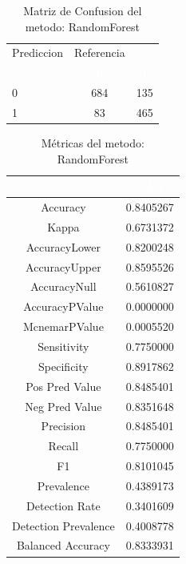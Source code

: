 \documentclass[]{article}
\begin{document}
\begin{table}[!h]

\caption{\label{tab:MatrizConf_RandomForest}Matriz de Confusion del metodo: RandomForest }
\centering
\begin{tabular}[t]{lcc}
\toprule
\multicolumn{1}{c}{Prediccion} & \multicolumn{1}{c}{Referencia} & \multicolumn{1}{c}{ } \\
\cmidrule(l{3pt}r{3pt}){1-1} \cmidrule(l{3pt}r{3pt}){2-2}
\rowcolor{black}  \multicolumn{1}{c}{\textcolor{white}{\textbf{ }}} & \multicolumn{1}{c}{\textcolor{white}{\textbf{0}}} & \multicolumn{1}{c}{\textcolor{white}{\textbf{1}}}\\
\midrule
\rowcolor{gray!6}  0 & 684 & 135\\
1 & 83 & 465\\
\bottomrule
\end{tabular}
\end{table}

\begin{table}[!h]

\caption{\label{tab:metricas_RandomForest}Métricas del metodo: RandomForest }
\centering
\begin{tabular}[t]{cc}
\toprule
\rowcolor{black}  \multicolumn{1}{c}{\textcolor{white}{\textbf{metricas}}} & \multicolumn{1}{c}{\textcolor{white}{\textbf{valor}}}\\
\midrule
\rowcolor{gray!6}  Accuracy & 0.8405267\\
Kappa & 0.6731372\\
\rowcolor{gray!6}  AccuracyLower & 0.8200248\\
AccuracyUpper & 0.8595526\\
\rowcolor{gray!6}  AccuracyNull & 0.5610827\\
\addlinespace
AccuracyPValue & 0.0000000\\
\rowcolor{gray!6}  McnemarPValue & 0.0005520\\
Sensitivity & 0.7750000\\
\rowcolor{gray!6}  Specificity & 0.8917862\\
Pos Pred Value & 0.8485401\\
\addlinespace
\rowcolor{gray!6}  Neg Pred Value & 0.8351648\\
Precision & 0.8485401\\
\rowcolor{gray!6}  Recall & 0.7750000\\
F1 & 0.8101045\\
\rowcolor{gray!6}  Prevalence & 0.4389173\\
\addlinespace
Detection Rate & 0.3401609\\
\rowcolor{gray!6}  Detection Prevalence & 0.4008778\\
Balanced Accuracy & 0.8333931\\
\bottomrule
\end{tabular}
\end{table}
\end{document}
